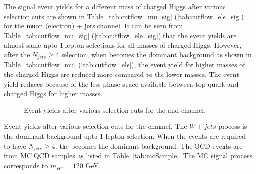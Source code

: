 The signal event yields for a different mass of charged Higgs after 
various selection cuts are shown in Table~\ref{tab:cutflow_mu_sig} (\ref{tab:cutflow_ele_sig}) 
for the muon (electron) + jets channel. It can be seen from 
Table~\ref{tab:cutflow_mu_sig} (\ref{tab:cutflow_ele_sig}) that the event yields are almost 
same upto 1-lepton selections for all masses of charged Higgs. 
However, after the $N_{jets} \geq 4$ selection, when \ttjets becomes the dominant 
background as shown in Table~\ref{tab:cutflow_mu} (\ref{tab:cutflow_ele}), the event yield 
for higher masses of the charged Higgs are reduced more compared to the lower masses. The 
event yield reduces because of the less phase space available between top-quark and charged 
Higgs for higher masses.
    
\begin{figure}
\centering
{}
\caption{ Event yields after various selection cuts for the \mujets and \ejets channel.} 
\label{fig:cutflow}
\end{figure}

\begin{table}
    \caption{Event yields after various selection cuts for the \mujets
    channel. The $W + jets$ process is the dominant background upto 1-lepton 
    selection. When the events are required to have $N_{jets} \geq 4$, the 
    \ttjets becomes the dominant background. The QCD events are 
    from MC QCD samples as listed in Table~\ref{tab:mcSample}. The MC signal
process corresponds to $m_{H^+}=120$ GeV.}
\label{tab:cutflow_mu}
\centering

\end{table}

